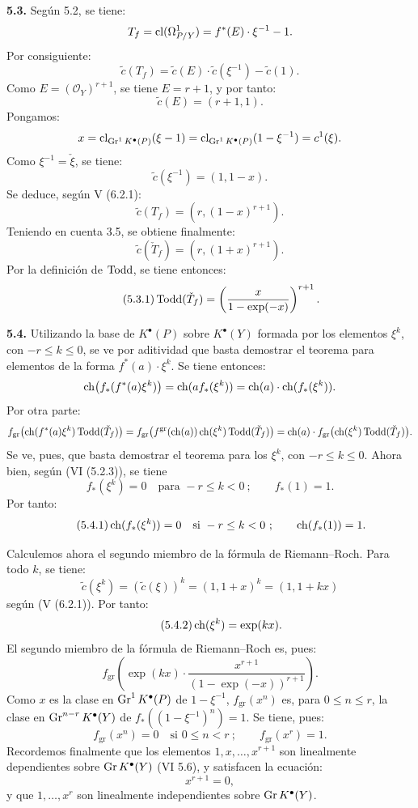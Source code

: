 \textbf{5.3.} Según 5.2, se tiene:
\[
 T_f=\cl(\Omega^1_{P/Y})=\sisi{g^*(E)}{f^*(E)}\cdot\xi^{-1}-1.
\]
Por consiguiente:
\[
 \widetilde c(T_f)=\widetilde c(E)\cdot\widetilde c(\xi^{-1})-\widetilde c(1).
\]
Como \(E=(\mathcal O_Y)^{r+1}\), se tiene \(E=r+1\), y por tanto:
\[
 \widetilde c(E)=(r+1,1).
\]
Pongamos:
\[
 x=\cl_{\Gr^1K^{\bullet}(P)}(\xi-1)
 =
 \cl_{\Gr^1K^{\bullet}(P)}(1-\xi^{-1})
 =
 c^1(\xi).
\]
Como \(\xi^{-1}=\check \xi\), se tiene:
\[
 \widetilde c(\xi^{-1})=(1,1-x).
\]
Se deduce, según V (6.2.1):
\[
 \widetilde c(T_f)=(r,(1-x)^{r+1}).
\]
Teniendo en cuenta 3.5, se obtiene finalmente:
\[
 \widetilde c(\check T_f)=(r,(1+x)^{r+1}).
\]
Por la definición de \(\Todd\), se tiene entonces:
\begin{equation}\tag{5.3.1}
 \Todd(\check T_f)=
 \left(\frac{x}{1-\exp(-x)}\right)^{r+1}.
\end{equation}

\textbf{5.4.} Utilizando la base de \(K^{\bullet}(P)\) sobre
\(K^{\bullet}(Y)\) formada por los elementos \(\xi^k\), con
\(-r\leq k\leq0\), se ve por aditividad que basta demostrar el teorema para
elementos de la forma \(f^*(a)\cdot\xi^k\). Se tiene entonces:
\[
 \ch\bigl(f_*(f^*(a)\xi^k)\bigr)
 =
 \ch(a f_*(\xi^k))
 =
 \ch(a)\cdot\ch(f_*(\xi^k)).
\]
Por otra parte:
\[
 f_{\mathrm{gr}}\bigl(\ch(f^*(a)\xi^k)\Todd(\check T_f)\bigr)
 =
 f_{\mathrm{gr}}\bigl(f^{\mathrm{gr}}(\ch(a))\ch(\xi^k)\Todd(\check T_f)\bigr)
 =
 \ch(a)\cdot f_{\mathrm{gr}}\bigl(\ch(\xi^k)\Todd(\check T_f)\bigr).
\]
Se ve, pues, que basta demostrar el teorema para los \(\xi^k\), con
\(-r\leq k\leq0\). Ahora bien, según (VI (5.2.3)), se tiene
\[
 f_*(\xi^k)=0\quad\text{para }-r\leq k<0~;\qquad f_*(1)=1.
\]
Por tanto:
\begin{equation}\tag{5.4.1}
 \ch(f_*(\xi^k))=0\quad\text{si }-r\leq k<0~;\qquad
 \ch(f_*(1))=1.
\end{equation}

Calculemos ahora el segundo miembro de la fórmula de Riemann--Roch. Para todo
\(k\), se tiene:
\[
 \widetilde c(\xi^k)=(\widetilde c(\xi))^k=(1,1+x)^k=(1,1+kx)
\]
según (V (6.2.1)). Por tanto:
\begin{equation}\tag{5.4.2}
 \ch(\xi^k)=\exp(kx).
\end{equation}
El segundo miembro de la fórmula de Riemann--Roch es, pues:
\begin{equation}\tag{5.4.3}
 f_{\mathrm{gr}}\left(\exp(kx)\cdot
 \frac{x^{r+1}}{(1-\exp(-x))^{r+1}}\right).
\end{equation}
Como \(x\) es la clase en \(\Gr^1K^{\bullet}(P)\) de \(1-\xi^{-1}\),
\(f_{\mathrm{gr}}(x^n)\) es, para \(0\leq n\leq r\), la clase en
\(\Gr^{n-r}K^{\bullet}(Y)\) de
\(f_*((1-\xi^{-1})^n)=1\). Se tiene, pues:
\begin{equation}\tag{5.4.4}
 f_{\mathrm{gr}}(x^n)=0\quad\text{si }0\leq n<r~;\qquad
 f_{\mathrm{gr}}(x^r)=1.
\end{equation}
Recordemos finalmente que los elementos \(1,x,\ldots,x^{r+1}\) son
linealmente dependientes sobre \(\Gr K^{\bullet}(Y)\) (VI 5.6), y satisfacen
la ecuación:
\begin{equation}\tag{5.4.5}
 x^{r+1}=0,
\end{equation}
y que \(1,\ldots,x^r\) son linealmente independientes sobre
\(\Gr K^{\bullet}(Y)\).

